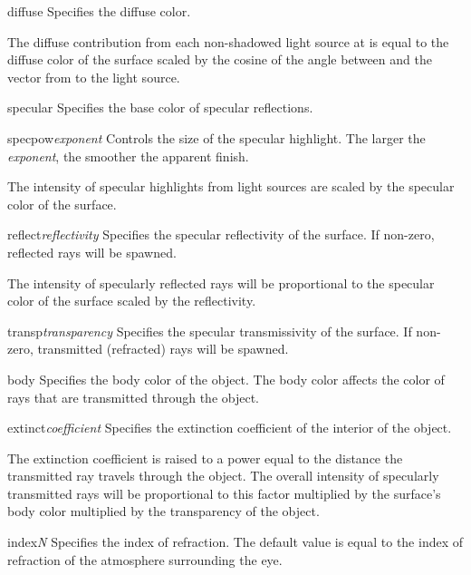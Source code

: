 \begin{defkey}{diffuse}{}
	Specifies the diffuse color.
\end{defkey}
The diffuse contribution from each non-shadowed light source at 
is equal to the diffuse color of the surface scaled by the cosine of
the angle between 
and the vector from  to the light source.

\begin{defkey}{specular}{}
	Specifies the base color of specular reflections.
\end{defkey}

\begin{defkey}{specpow}{{\em exponent}}
	Controls the size of the specular highlight. The larger
	the {\em exponent}, the smoother the apparent finish.
\end{defkey}
The intensity of specular highlights from light sources are
scaled by the specular color of the surface.

\begin{defkey}{reflect}{{\em reflectivity}}
	Specifies the specular reflectivity of the surface.  If non-zero,
	reflected rays will be spawned.
\end{defkey}
The intensity of specularly reflected rays will be proportional to
the specular color of the surface scaled by the reflectivity.

\begin{defkey}{transp}{{\em transparency}}
	Specifies the specular transmissivity of the surface.  If
	non-zero,
	transmitted (refracted) rays will be spawned.
\end{defkey}

\begin{defkey}{body}{}
	Specifies the body color of the object.  The body color
	affects the color of rays that are transmitted through the
	object.
\end{defkey}

\begin{defkey}{extinct}{{\em coefficient}}
	Specifies the extinction coefficient of the interior
	of the object.
\end{defkey}
The extinction coefficient is raised to a power equal to the distance
the transmitted ray travels through the object.
The overall intensity of specularly transmitted rays will be proportional to
this factor multiplied by the surface's body color
multiplied by the transparency of the object.

\begin{defkey}{index}{{\em N}}
	Specifies the index of refraction.  The default value is equal
	to the index of refraction of the atmosphere surrounding the eye.
\end{defkey}

